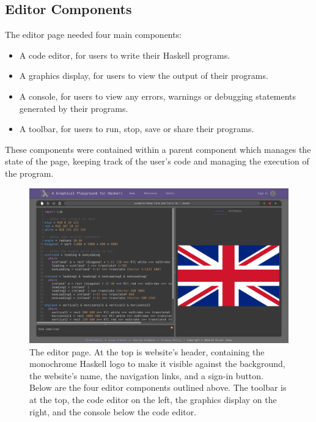 \documentclass[../main.tex]{subfiles}
\begin{document}
        \subsection{Editor Components}
            The editor page needed four main components:
            \begin{itemize}
                \item A code editor, for users to write their Haskell programs.
                \item A graphics display, for users to view the output of their programs.
                \item A console, for users to view any errors, warnings or debugging statements
                      generated by their programs.
                \item A toolbar, for users to run, stop, save or share their programs.
            \end{itemize}
            These components were contained within a parent component which manages the
                state of the page, keeping track of the user's code and managing the execution
                of the program.

            \begin{figure}[H]
                \centering
                \includegraphics[width=0.75\linewidth]{images/editor.png}
                    \caption{The editor page.
                        At the top is website's header, containing the monochrome Haskell logo to make
                            it visible against the background, the website's name, the navigation links,
                            and a sign-in button.
                        Below are the four editor components outlined above.
                        The toolbar is at the top, the code editor on the left, the graphics display on
                            the right, and the console below the code editor.
                    }
                    \label{fig:editor}
            \end{figure}
\end{document}
